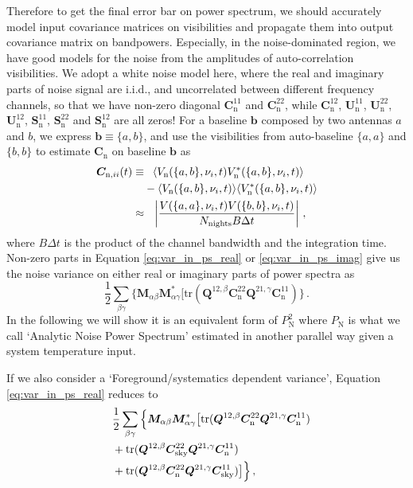 \documentclass[12pt,a4paper]{article}
\begin{document}
Therefore to get the final error bar on power spectrum, we should accurately model input covariance matrices on visibilities and propagate them into output covariance matrix on bandpowers. Especially, in the noise-dominated region, we have good models for the noise from the amplitudes of auto-correlation visibilities. We adopt a white noise model here, where the real and imaginary parts of noise signal are i.i.d., and uncorrelated between different frequency channels, so that we have non-zero diagonal $\bm{C}_\text{n}^{11}$ and $\bm{C}_\text{n}^{22}$, while $\bm{C}_\text{n}^{12}$, $\bm{U}_\text{n}^{11}$, $\bm{U}_\text{n}^{22}$, $\bm{U}_\text{n}^{12}$, $\bm{S}_\text{n}^{11}$, $\bm{S}_\text{n}^{22}$ and $\bm{S}_\text{n}^{12}$ are all zeros! For a baseline $\bm{b}$ composed by two antennas $a$ and $b$, we express $\bm{b} \equiv \{a,b\}$, and use the visibilities from auto-baseline $\{a,a\}$ and $\{b,b\}$ to estimate $\bm{C}_\text{n}$ on baseline $\bm{b}$ as \citep{2015ApJ...801...51J}
\begin{align}
\label{eq:auto_vis_noise}
   \bm{C}_{\text{n},ii}(t) \equiv & \phantom{-} \langle V_\text{n}(\{a,b\},\nu_i,t) V_\text{n}^*(\{a,b\},\nu_i,t) \rangle \notag \\
   & - \langle V_\text{n}(\{a,b\},\nu_i,t) \rangle \langle V_\text{n}^*(\{a,b\},\nu_i,t) \rangle \notag \\
   \approx &  \phantom{-} \left|\frac{V(\{a,a\}, \nu_i,t)V(\{b,b\}, \nu_i,t)}{N_\text{nights} B \Delta t}\right| \,,
\end{align}
where $B\Delta t$ is the product of the channel bandwidth and the integration time. Non-zero parts in Equation \ref{eq:var_in_ps_real} or \ref{eq:var_in_ps_imag} give us the noise variance on either real or imaginary parts of power spectra as 
\begin{equation}
\label{eq:analytic_noise_variance}
\frac{1}{2} \sum_{\beta\gamma} 
    \Big\{\bm{M}_{\alpha\beta} \bm{M}_{\alpha\gamma}^* \big[\text{tr}(\bm{Q}^{12,\beta} \bm{C}_\text{n}^{22} \bm{Q}^{21,\gamma} \bm{C}_\text{n}^{11}) \Big\}\,.    
\end{equation}
In the following we will show it is an equivalent form of $P_\text{N}^2$ where $P_\text{N}$ is what we call `Analytic Noise Power Spectrum' estimated in another parallel way given a system temperature input.      

If we also consider a `Foreground/systematics dependent variance', Equation \ref{eq:var_in_ps_real} reduces to 
\begin{align}
\label{eq:reduced_var_in_ps_real}
    & \frac{1}{2} \sum_{\beta\gamma} 
    \Big\{\bm{M}_{\alpha\beta} \bm{M}_{\alpha\gamma}^* \big[\text{tr}(\bm{Q}^{12,\beta} \bm{C}_\text{n}^{22} \bm{Q}^{21,\gamma} \bm{C}_\text{n}^{11}) 
    \notag \\
    \phantom{=} & + \text{tr}(\bm{Q}^{12,\beta} \bm{C}_\text{sky}^{22} \bm{Q}^{21,\gamma} \bm{C}_\text{n}^{11}) 
    \notag \\ 
    \phantom{=} & + \text{tr}(\bm{Q}^{12,\beta} \bm{C}_\text{n}^{22} \bm{Q}^{21,\gamma} \bm{C}_\text{sky}^{11}) \big]  \Big\}\,,
\end{align}
\end{document}
